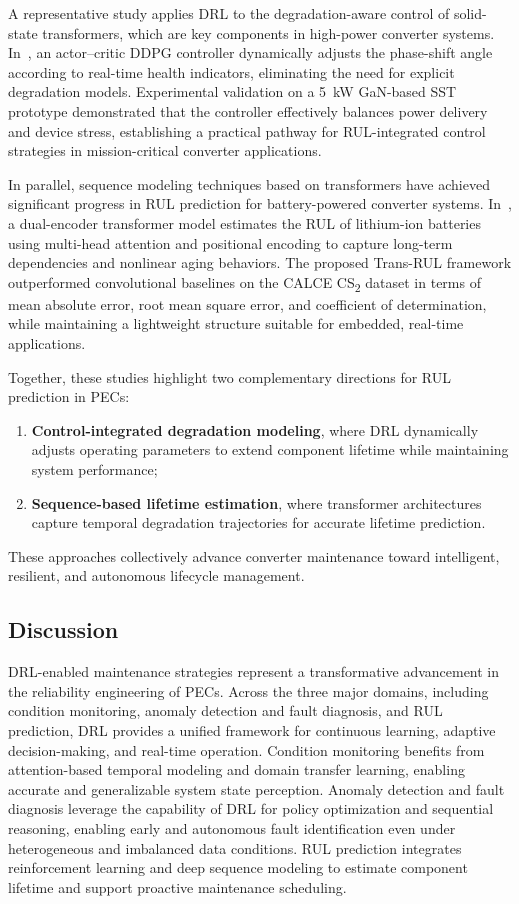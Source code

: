 A representative study applies DRL to the degradation-aware control of solid-state transformers, which are key components in high-power converter systems. 
In~\cite{haque2021deep}, an actor–critic DDPG controller dynamically adjusts the phase-shift angle according to real-time health indicators, eliminating the need for explicit degradation models. 
Experimental validation on a 5~kW GaN-based SST prototype demonstrated that the controller effectively balances power delivery and device stress, establishing a practical pathway for RUL-integrated control strategies in mission-critical converter applications.

In parallel, sequence modeling techniques based on transformers have achieved significant progress in RUL prediction for battery-powered converter systems. 
In~\cite{saleem2024transrul}, a dual-encoder transformer model estimates the RUL of lithium-ion batteries using multi-head attention and positional encoding to capture long-term dependencies and nonlinear aging behaviors. 
The proposed Trans-RUL framework outperformed convolutional baselines on the CALCE CS\textsubscript{2} dataset in terms of mean absolute error, root mean square error, and coefficient of determination, while maintaining a lightweight structure suitable for embedded, real-time applications.

Together, these studies highlight two complementary directions for RUL prediction in PECs:
\begin{enumerate}
  \item \textbf{Control-integrated degradation modeling}, where DRL dynamically adjusts operating parameters to extend component lifetime while maintaining system performance;
  \item \textbf{Sequence-based lifetime estimation}, where transformer architectures capture temporal degradation trajectories for accurate lifetime prediction.
\end{enumerate}

These approaches collectively advance converter maintenance toward intelligent, resilient, and autonomous lifecycle management.


\subsection{Discussion}
\label{sec:maintenance_discussion}

DRL-enabled maintenance strategies represent a transformative advancement in the reliability engineering of PECs.
Across the three major domains, including condition monitoring, anomaly detection and fault diagnosis, and RUL prediction, DRL provides a unified framework for continuous learning, adaptive decision-making, and real-time operation.
Condition monitoring benefits from attention-based temporal modeling and domain transfer learning, enabling accurate and generalizable system state perception. 
Anomaly detection and fault diagnosis leverage the capability of DRL for policy optimization and sequential reasoning, enabling early and autonomous fault identification even under heterogeneous and imbalanced data conditions.
RUL prediction integrates reinforcement learning and deep sequence modeling to estimate component lifetime and support proactive maintenance scheduling.

